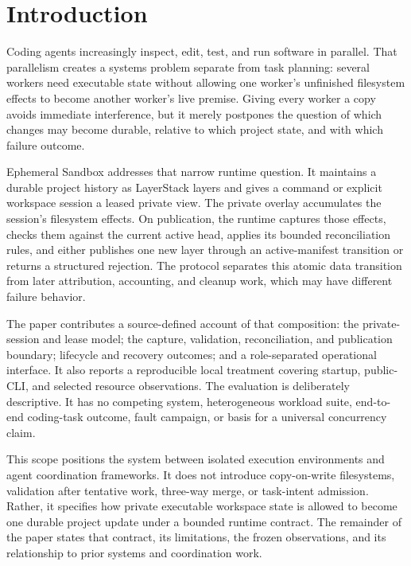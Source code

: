 \section{Introduction}
\label{sec:introduction}

Coding agents increasingly inspect, edit, test, and run software in parallel.
That parallelism creates a systems problem separate from task planning: several
workers need executable state without allowing one worker's unfinished
filesystem effects to become another worker's live premise. Giving every
worker a copy avoids immediate interference, but it merely postpones the
question of which changes may become durable, relative to which project state,
and with which failure outcome.

Ephemeral Sandbox addresses that narrow runtime question. It maintains a
durable project history as LayerStack layers and gives a command or explicit
workspace session a leased private view. The private overlay accumulates the
session's filesystem effects. On publication, the runtime captures those
effects, checks them against the current active head, applies its bounded
reconciliation rules, and either publishes one new layer through an
active-manifest transition or returns a structured rejection. The protocol
separates this atomic data transition from later attribution, accounting, and
cleanup work, which may have different failure behavior.

The paper contributes a source-defined account of that composition: the
private-session and lease model; the capture, validation, reconciliation, and
publication boundary; lifecycle and recovery outcomes; and a role-separated
operational interface. It also reports a reproducible local treatment covering
startup, public-CLI, and selected resource observations. The evaluation is
deliberately descriptive. It has no competing system, heterogeneous workload
suite, end-to-end coding-task outcome, fault campaign, or basis for a universal
concurrency claim.

This scope positions the system between isolated execution environments and
agent coordination frameworks. It does not introduce copy-on-write
filesystems, validation after tentative work, three-way merge, or task-intent
admission. Rather, it specifies how private executable workspace state is
allowed to become one durable project update under a bounded runtime contract.
The remainder of the paper states that contract, its limitations, the frozen
observations, and its relationship to prior systems and coordination work.
